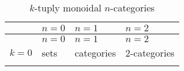 \documentclass{article}
\begin{document}
\begin{longtable}[]{@{}llll@{}}
\caption{\(k\)-tuply monoidal \(n\)-categories}\tabularnewline
\toprule
\begin{minipage}[b]{0.26\columnwidth}\raggedright
\strut
\end{minipage} & \begin{minipage}[b]{0.21\columnwidth}\raggedright
\(n=0\)\strut
\end{minipage} & \begin{minipage}[b]{0.21\columnwidth}\raggedright
\(n=1\)\strut
\end{minipage} & \begin{minipage}[b]{0.21\columnwidth}\raggedright
\(n=2\)\strut
\end{minipage}\tabularnewline
\midrule
\endfirsthead
\toprule
\begin{minipage}[b]{0.26\columnwidth}\raggedright
\strut
\end{minipage} & \begin{minipage}[b]{0.21\columnwidth}\raggedright
\(n=0\)\strut
\end{minipage} & \begin{minipage}[b]{0.21\columnwidth}\raggedright
\(n=1\)\strut
\end{minipage} & \begin{minipage}[b]{0.21\columnwidth}\raggedright
\(n=2\)\strut
\end{minipage}\tabularnewline
\midrule
\endhead
\begin{minipage}[t]{0.26\columnwidth}\raggedright
\(k=0\)\strut
\end{minipage} & \begin{minipage}[t]{0.21\columnwidth}\raggedright
sets\strut
\end{minipage} & \begin{minipage}[t]{0.21\columnwidth}\raggedright
categories\strut
\end{minipage} & \begin{minipage}[t]{0.21\columnwidth}\raggedright
2-categories\strut
\end{minipage}\tabularnewline
\begin{minipage}[t]{0.26\columnwidth}\raggedright
\strut
\end{minipage} & \begin{minipage}[t]{0.21\columnwidth}\raggedright
\strut
\end{minipage} & \begin{minipage}[t]{0.21\columnwidth}\raggedright
\strut
\end{minipage} & \begin{minipage}[t]{0.21\columnwidth}\raggedright

\end{minipage}
\end{longtable}
\end{document}

